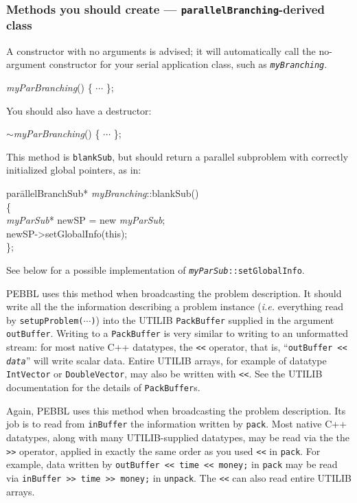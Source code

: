 \subsubsection{Methods you should create ---
  \texttt{parallelBranching}-derived class}
A constructor with no arguments is advised; it will automatically call
the no-argument constructor for your serial application class, such as
\texttt{\emph{myBranching}}. 
\begin{codeblock}
\emph{myParBranching}() \{ $\cdots$ \}; \\
\end{codeblock}

You should also have a destructor:
\begin{codeblock}
$\sim$\emph{myParBranching}() \{ $\cdots$ \}; \\
\end{codeblock}

This method is \texttt{blankSub}, but should return a parallel
subproblem with correctly initialized global pointers, as in:
\begin{codeblock}
par\=allelBranchSub* \emph{myBranching}::blankSub() \\
\{ \\
\>   \emph{myParSub}* newSP = new \emph{myParSub}; \\
\>    newSP->setGlobalInfo(this);\\
\};
\end{codeblock}
See below for a possible implementation of
\texttt{\emph{myParSub}::setGlobalInfo}.

PEBBL uses this
method when broadcasting the problem description.  It should write all
the the information describing a problem instance (\emph{i.e.}
everything read by \texttt{setupProblem($\cdots$)}) into the UTILIB
\texttt{PackBuffer} supplied in the argument \texttt{outBuffer}.
Writing to a \texttt{PackBuffer} is very similar to writing to an
unformatted stream: for most native C++ datatypes, the \texttt{<<}
operator, that is, ``\texttt{outBuffer << \emph{data}}'' will write
scalar data.  Entire UTILIB arrays, for example of datatype
\texttt{IntVector} or \texttt{DoubleVector}, may also be written with
\texttt{<<}.  See the UTILIB documentation for the details of
\texttt{PackBuffer}s.

Again, PEBBL
uses this method when broadcasting the problem description.  Its job
is to read from
\texttt{inBuffer} the information written by \texttt{pack}.  Most native C++
datatypes, along with many UTILIB-supplied datatypes, may be read via
the the \texttt{>>} operator, applied in exactly the same order as you
used \texttt{<<} in \texttt{pack}.  For example, data written by
\texttt{outBuffer << time << money;} in \texttt{pack} may be read via
\texttt{inBuffer >> time >> money;} in \texttt{unpack}.  The
\texttt{<<} can also read entire UTILIB arrays.

